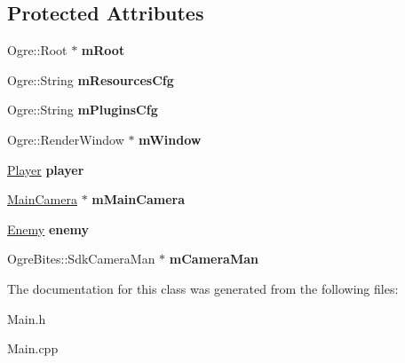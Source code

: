 \subsection*{Protected Attributes}
\begin{DoxyCompactItemize}
\item 
\hypertarget{class_main_a652fc62fa43ccf55670d6c839c48743a}{}Ogre\+::\+Root $\ast$ {\bfseries m\+Root}\label{class_main_a652fc62fa43ccf55670d6c839c48743a}

\item 
\hypertarget{class_main_aff38502c06a9886eb8e671821d39f9f5}{}Ogre\+::\+String {\bfseries m\+Resources\+Cfg}\label{class_main_aff38502c06a9886eb8e671821d39f9f5}

\item 
\hypertarget{class_main_ac5974cc5633e82bc3b1e3c8341bbdab4}{}Ogre\+::\+String {\bfseries m\+Plugins\+Cfg}\label{class_main_ac5974cc5633e82bc3b1e3c8341bbdab4}

\item 
\hypertarget{class_main_ae982ce1806d05dee26bb7c89f970e21c}{}Ogre\+::\+Render\+Window $\ast$ {\bfseries m\+Window}\label{class_main_ae982ce1806d05dee26bb7c89f970e21c}

\item 
\hypertarget{class_main_a4668c9d8815ef017ae949030d870599f}{}\hyperlink{class_player}{Player} {\bfseries player}\label{class_main_a4668c9d8815ef017ae949030d870599f}

\item 
\hypertarget{class_main_af013569acae33b762f8671e7fe28e6dc}{}\hyperlink{class_main_camera}{Main\+Camera} $\ast$ {\bfseries m\+Main\+Camera}\label{class_main_af013569acae33b762f8671e7fe28e6dc}

\item 
\hypertarget{class_main_a5d46009c71d4ee9ddf0f1e4dbbdc9bfd}{}\hyperlink{class_enemy}{Enemy} {\bfseries enemy}\label{class_main_a5d46009c71d4ee9ddf0f1e4dbbdc9bfd}

\item 
\hypertarget{class_main_aabf11bb20aaced75761f6c25f7c2d240}{}Ogre\+Bites\+::\+Sdk\+Camera\+Man $\ast$ {\bfseries m\+Camera\+Man}\label{class_main_aabf11bb20aaced75761f6c25f7c2d240}

\end{DoxyCompactItemize}


The documentation for this class was generated from the following files\+:\begin{DoxyCompactItemize}
\item 
Main.\+h\item 
Main.\+cpp\end{DoxyCompactItemize}
